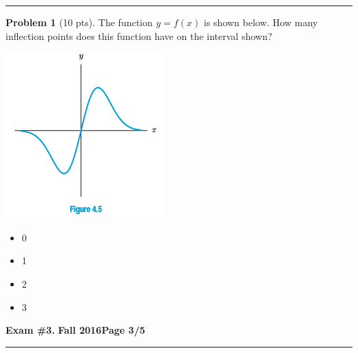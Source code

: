 \documentclass[12pt]{article}
\makeatletter
\theoremstyle{definition}
\newtheorem{problem}{Problem}
\newcommand*{\radiobutton}{%
  \@ifstar{\@radiobutton0}{\@radiobutton1}%
}
\newcommand*{\@radiobutton}[1]{%
  \begin{tikzpicture}
    \pgfmathsetlengthmacro\radius{height("X")/2}
    \draw[radius=\radius] circle;
    \ifcase#1 \fill[radius=.6*\radius] circle;\fi
  \end{tikzpicture}%
}
\makeatother
\begin{document}
\vspace{3cm}
\hrule
\begin{problem}[10 pts]
The function $y=f(x)$ is shown below.  How many inflection points does this function have on the interval shown?
\begin{center}
\includegraphics{3graph1.png}
\end{center}
\begin{itemize}
\item[\radiobutton] 0
\item[\radiobutton] 1
\item[\radiobutton] 2
\item[\radiobutton] 3
\end{itemize}
\end{problem}
\newpage

\hfill{\large\bf Exam \#3.}\hfill{\large\bf
  Fall 2016}\hfill{\large\bf Page 3/5}\hrule
\end{document}
